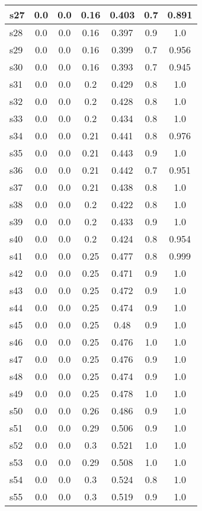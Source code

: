 \documentclass{article}
\begin{document}
\begin{tabular}{|l|c|c|c|c|c|c|}
\hline
s27 &0.0 & 0.0 & 0.16 & 0.403 & 0.7 & 0.891\\
\hline
s28 &0.0 & 0.0 & 0.16 & 0.397 & 0.9 & 1.0\\
\hline
s29 &0.0 & 0.0 & 0.16 & 0.399 & 0.7 & 0.956\\
\hline
s30 &0.0 & 0.0 & 0.16 & 0.393 & 0.7 & 0.945\\
\hline
s31 &0.0 & 0.0 & 0.2 & 0.429 & 0.8 & 1.0\\
\hline
s32 &0.0 & 0.0 & 0.2 & 0.428 & 0.8 & 1.0\\
\hline
s33 &0.0 & 0.0 & 0.2 & 0.434 & 0.8 & 1.0\\
\hline
s34 &0.0 & 0.0 & 0.21 & 0.441 & 0.8 & 0.976\\
\hline
s35 &0.0 & 0.0 & 0.21 & 0.443 & 0.9 & 1.0\\
\hline
s36 &0.0 & 0.0 & 0.21 & 0.442 & 0.7 & 0.951\\
\hline
s37 &0.0 & 0.0 & 0.21 & 0.438 & 0.8 & 1.0\\
\hline
s38 &0.0 & 0.0 & 0.2 & 0.422 & 0.8 & 1.0\\
\hline
s39 &0.0 & 0.0 & 0.2 & 0.433 & 0.9 & 1.0\\
\hline
s40 &0.0 & 0.0 & 0.2 & 0.424 & 0.8 & 0.954\\
\hline
s41 &0.0 & 0.0 & 0.25 & 0.477 & 0.8 & 0.999\\
\hline
s42 &0.0 & 0.0 & 0.25 & 0.471 & 0.9 & 1.0\\
\hline
s43 &0.0 & 0.0 & 0.25 & 0.472 & 0.9 & 1.0\\
\hline
s44 &0.0 & 0.0 & 0.25 & 0.474 & 0.9 & 1.0\\
\hline
s45 &0.0 & 0.0 & 0.25 & 0.48 & 0.9 & 1.0\\
\hline
s46 &0.0 & 0.0 & 0.25 & 0.476 & 1.0 & 1.0\\
\hline
s47 &0.0 & 0.0 & 0.25 & 0.476 & 0.9 & 1.0\\
\hline
s48 &0.0 & 0.0 & 0.25 & 0.474 & 0.9 & 1.0\\
\hline
s49 &0.0 & 0.0 & 0.25 & 0.478 & 1.0 & 1.0\\
\hline
s50 &0.0 & 0.0 & 0.26 & 0.486 & 0.9 & 1.0\\
\hline
s51 &0.0 & 0.0 & 0.29 & 0.506 & 0.9 & 1.0\\
\hline
s52 &0.0 & 0.0 & 0.3 & 0.521 & 1.0 & 1.0\\
\hline
s53 &0.0 & 0.0 & 0.29 & 0.508 & 1.0 & 1.0\\
\hline
s54 &0.0 & 0.0 & 0.3 & 0.524 & 0.8 & 1.0\\
\hline
s55 &0.0 & 0.0 & 0.3 & 0.519 & 0.9 & 1.0\\

\end{tabular}
\end{document}
